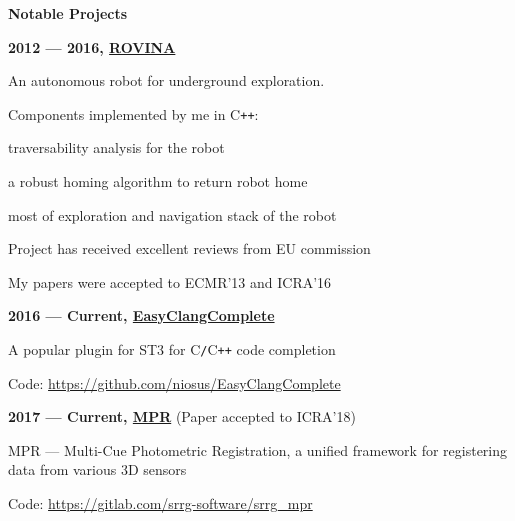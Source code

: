 \documentclass[a4paper,12pt,final]{memoir}
\newcommand{\SmallSep}{\vspace{0.5em}}
\newcommand{\CVSection}[1]
	{\Large\textbf{#1}\par
	\SmallSep\normalsize\normalfont}
\newcommand{\CVItem}[1]
	{\textbf{\color{MidnightBlue} #1}}
\begin{document}
\CVSection{Notable Projects}
\CVItem{2012 --- 2016, \href{http://www.rovina-project.eu/}{ROVINA}}
\begin{compactitem}[\color{MidnightBlue}$\circ$]
	\item An autonomous robot for underground exploration.
	\item Components implemented by me in C\texttt{++}:
	\begin{compactitem}[\color{MidnightBlue}$-$]
	 	\item traversability analysis for the robot
	 	\item a robust homing algorithm to return robot home
		\item most of exploration and navigation stack of the robot
	 \end{compactitem}
	\item Project has received excellent reviews from EU commission
	\item My papers were accepted to ECMR'13 and ICRA'16
\end{compactitem}
\CVItem{2016 --- Current, \href{https://github.com/niosus/EasyClangComplete}{EasyClangComplete}}
\begin{compactitem}[\color{MidnightBlue}$\circ$]
	\item A popular plugin for ST3 for C\texttt{/}C\texttt{++} code completion
	\item Code: \url{https://github.com/niosus/EasyClangComplete}
\end{compactitem}
\CVItem{2017 --- Current, \href{https://gitlab.com/srrg-software/srrg_mpr}{MPR}} (Paper accepted to ICRA'18)
\begin{compactitem}[\color{MidnightBlue}$\circ$]
	\item MPR --- Multi-Cue Photometric Registration, a unified framework for
	registering data from various 3D sensors
	\item Code: \url{https://gitlab.com/srrg-software/srrg_mpr}
\end{compactitem}
\SmallSep
\end{document}
